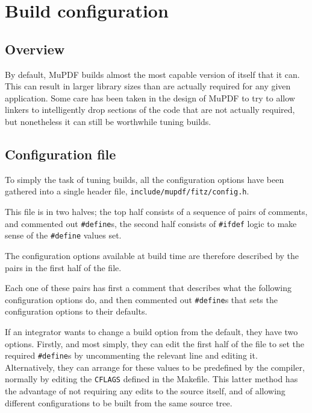 \documentclass[oneside]{book}
\begin{document}
\chapter{Build configuration}
\label{BuildConfiguration}

\section{Overview}

By default, MuPDF builds almost the most capable version of itself that it can. This can result in larger library sizes than are actually required for any given application. Some care has been taken in the design of MuPDF to try to allow linkers to intelligently drop sections of the code that are not actually required, but nonetheless it can still be worthwhile tuning builds.

\section{Configuration file}

To simply the task of tuning builds, all the configuration options have been gathered into a single header file, \texttt{include\slash mupdf\slash fitz\slash config.h}.

This file is in two halves; the top half consists of a sequence of pairs of comments, and commented out \texttt{\#define}s, the second half consists of \texttt{\#ifdef} logic to make sense of the \texttt{\#define} values set.

The configuration options available at build time are therefore described by the pairs in the first half of the file.

Each one of these pairs has first a comment that describes what the following configuration options do, and then commented out \texttt{\#define}s that sets the configuration options to their defaults.

If an integrator wants to change a build option from the default, they have two options. Firstly, and most simply, they can edit the first half of the file to set the required \texttt{\#define}s by uncommenting the relevant line and editing it. Alternatively, they can arrange for these values to be predefined by the compiler, normally by editing the \texttt{CFLAGS} defined in the Makefile. This latter method has the advantage of not requiring any edits to the source itself, and of allowing different configurations to be built from the same source tree.
\end{document}
